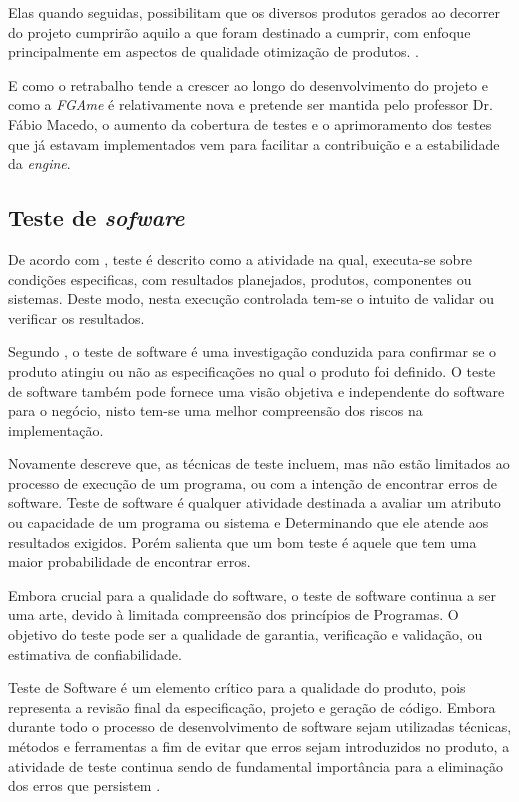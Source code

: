 Elas quando seguidas, possibilitam que os diversos produtos gerados ao decorrer do projeto cumprirão aquilo a que foram destinado a cumprir, com enfoque principalmente em  aspectos de qualidade otimização de produtos.
.\cite{gregor}

E como o retrabalho tende a crescer ao longo do desenvolvimento do projeto e como a \textit{FGAme} é relativamente nova e pretende ser mantida pelo professor Dr. Fábio Macedo, o aumento da cobertura de testes e o aprimoramento dos testes que já estavam implementados vem para facilitar a contribuição e a estabilidade da \textit{engine}.


\subsection{Teste de \textit{sofware}}
	De acordo com \cite{IEEE}, teste é descrito como a atividade na qual, executa-se sobre condições especificas, com resultados planejados, produtos, componentes ou sistemas. Deste modo, nesta execução controlada tem-se o intuito de validar ou verificar os resultados.


Segundo \cite{artigo_intro_teste}, o teste de software é uma investigação conduzida para confirmar se o produto atingiu ou não as especificações no qual o produto foi definido. O teste de software também pode fornece uma visão objetiva e independente do software para o negócio, nisto tem-se uma melhor compreensão dos riscos na implementação. 

Novamente \cite{artigo_intro_teste} descreve que, as técnicas de teste incluem, mas não estão limitados ao processo de execução de um programa, ou com a intenção de encontrar erros de software. Teste de software é qualquer atividade destinada a avaliar um atributo ou capacidade de um programa ou sistema e Determinando que ele atende aos resultados exigidos. Porém \cite{artigo_intro_teste} salienta que um bom teste é aquele que tem uma maior probabilidade de encontrar erros.

Embora crucial para a qualidade do software, o teste de software continua a ser uma arte, devido à limitada compreensão dos princípios de Programas. 
 O objetivo do teste pode ser a qualidade de garantia, verificação e validação, ou estimativa de confiabilidade. 

Teste de Software é um elemento crítico para a qualidade do produto, pois representa a revisão final da especificação, projeto e geração de código. Embora durante todo o processo de desenvolvimento de software sejam utilizadas técnicas, métodos e ferramentas a fim de evitar que erros sejam introduzidos no produto, a atividade de teste continua sendo de fundamental importância para a eliminação dos erros que persistem \cite{maldonado}.

